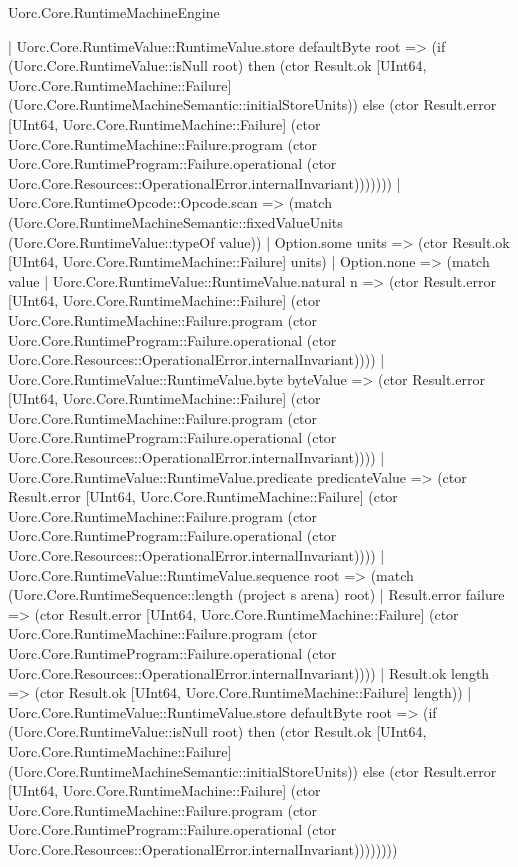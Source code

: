 \begin{lexlean}{Uorc.Core.RuntimeMachineEngine}
\begin{semanticmodule}
{              | Uorc.Core.RuntimeValue::RuntimeValue.store defaultByte root => (if (Uorc.Core.RuntimeValue::isNull root) then (ctor Result.ok [UInt64, Uorc.Core.RuntimeMachine::Failure] (Uorc.Core.RuntimeMachineSemantic::initialStoreUnits)) else (ctor Result.error [UInt64, Uorc.Core.RuntimeMachine::Failure] (ctor Uorc.Core.RuntimeMachine::Failure.program (ctor Uorc.Core.RuntimeProgram::Failure.operational (ctor Uorc.Core.Resources::OperationalError.internalInvariant)))))))
          | Uorc.Core.RuntimeOpcode::Opcode.scan => (match (Uorc.Core.RuntimeMachineSemantic::fixedValueUnits (Uorc.Core.RuntimeValue::typeOf value))
            | Option.some units => (ctor Result.ok [UInt64, Uorc.Core.RuntimeMachine::Failure] units)
            | Option.none => (match value
              | Uorc.Core.RuntimeValue::RuntimeValue.natural n => (ctor Result.error [UInt64, Uorc.Core.RuntimeMachine::Failure] (ctor Uorc.Core.RuntimeMachine::Failure.program (ctor Uorc.Core.RuntimeProgram::Failure.operational (ctor Uorc.Core.Resources::OperationalError.internalInvariant))))
              | Uorc.Core.RuntimeValue::RuntimeValue.byte byteValue => (ctor Result.error [UInt64, Uorc.Core.RuntimeMachine::Failure] (ctor Uorc.Core.RuntimeMachine::Failure.program (ctor Uorc.Core.RuntimeProgram::Failure.operational (ctor Uorc.Core.Resources::OperationalError.internalInvariant))))
              | Uorc.Core.RuntimeValue::RuntimeValue.predicate predicateValue => (ctor Result.error [UInt64, Uorc.Core.RuntimeMachine::Failure] (ctor Uorc.Core.RuntimeMachine::Failure.program (ctor Uorc.Core.RuntimeProgram::Failure.operational (ctor Uorc.Core.Resources::OperationalError.internalInvariant))))
              | Uorc.Core.RuntimeValue::RuntimeValue.sequence root => (match (Uorc.Core.RuntimeSequence::length (project s arena) root)
                | Result.error failure => (ctor Result.error [UInt64, Uorc.Core.RuntimeMachine::Failure] (ctor Uorc.Core.RuntimeMachine::Failure.program (ctor Uorc.Core.RuntimeProgram::Failure.operational (ctor Uorc.Core.Resources::OperationalError.internalInvariant))))
                | Result.ok length => (ctor Result.ok [UInt64, Uorc.Core.RuntimeMachine::Failure] length))
              | Uorc.Core.RuntimeValue::RuntimeValue.store defaultByte root => (if (Uorc.Core.RuntimeValue::isNull root) then (ctor Result.ok [UInt64, Uorc.Core.RuntimeMachine::Failure] (Uorc.Core.RuntimeMachineSemantic::initialStoreUnits)) else (ctor Result.error [UInt64, Uorc.Core.RuntimeMachine::Failure] (ctor Uorc.Core.RuntimeMachine::Failure.program (ctor Uorc.Core.RuntimeProgram::Failure.operational (ctor Uorc.Core.Resources::OperationalError.internalInvariant))))))))
}
\end{semanticmodule}
\end{lexlean}
